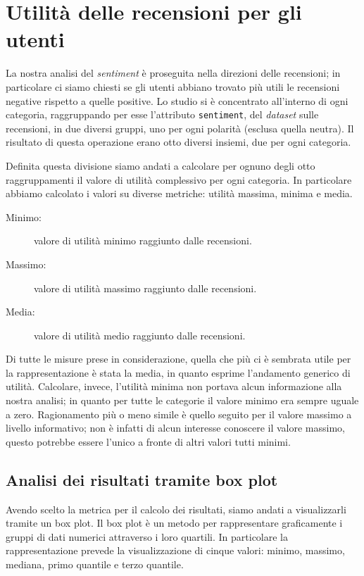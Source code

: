 		
	\section{Utilità delle recensioni per gli utenti}
		La nostra analisi del \textit{sentiment} è proseguita nella direzioni delle recensioni; in particolare ci siamo chiesti se gli utenti abbiano trovato più utili le recensioni negative rispetto a quelle positive. Lo studio si è concentrato all'interno di ogni categoria, raggruppando per esse l'attributo \verb|sentiment|, del \textit{dataset} sulle recensioni, in due diversi gruppi, uno per ogni polarità (esclusa quella neutra). Il risultato di questa operazione erano otto diversi insiemi, due per ogni categoria. 
		
		Definita questa divisione siamo andati a calcolare per ognuno degli otto raggruppamenti il valore di utilità complessivo per ogni categoria. In particolare abbiamo calcolato i valori su diverse metriche: utilità massima, minima e media.
		
		\begin{description}
			\item[Minimo:] valore di utilità minimo raggiunto dalle recensioni.
			\item[Massimo:] valore di utilità massimo raggiunto dalle recensioni.
			\item[Media:] valore di utilità medio raggiunto dalle recensioni.
		\end{description}
	
		Di tutte le misure prese in considerazione, quella che più ci è sembrata utile per la rappresentazione è stata la media, in quanto esprime l'andamento generico di utilità. Calcolare, invece, l'utilità minima non portava alcun informazione alla nostra analisi; in quanto per tutte le categorie il valore minimo era sempre uguale a zero. Ragionamento più o meno simile è quello seguito per il valore massimo a livello informativo; non è infatti di alcun interesse conoscere il valore massimo, questo potrebbe essere l'unico a fronte di altri valori tutti minimi. 
		
		\subsection{Analisi dei risultati tramite box plot}
			Avendo scelto la metrica per il calcolo dei risultati, siamo andati a visualizzarli tramite un box plot. Il box plot è un metodo per rappresentare graficamente i gruppi di dati numerici attraverso i loro quartili. In particolare la rappresentazione prevede la visualizzazione di cinque valori: minimo, massimo, mediana, primo quantile e terzo quantile.
			
